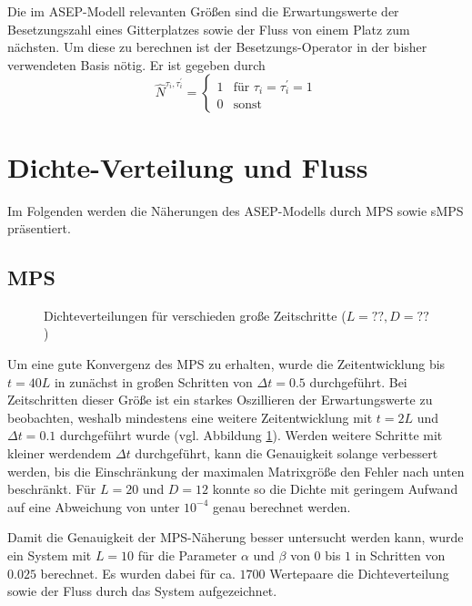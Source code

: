 \documentclass[10pt,a4paper]{report}
\begin{document}
Die im ASEP-Modell relevanten Größen sind die Erwartungswerte der Besetzungszahl eines Gitterplatzes sowie der Fluss von einem Platz zum nächsten. Um diese zu berechnen ist der Besetzungs-Operator in der bisher verwendeten Basis nötig. Er ist gegeben durch
\begin{equation}
\hat{N}^{\tau_i,\tau_i^{\prime}}=
\begin{cases}
1&\text{für }\tau_i=\tau_i^{\prime}=1\\
0&\text{sonst}
\end{cases}
\end{equation}

\section{Dichte-Verteilung und Fluss}
Im Folgenden werden die Näherungen des ASEP-Modells durch MPS sowie sMPS präsentiert. 
\subsection{MPS}

\begin{figure}
\centering
{}
\caption{Dichteverteilungen für verschieden große Zeitschritte ($L=??,D=??$)}
\label{tMPS_time_error_img}
\end{figure}

Um eine gute Konvergenz des MPS zu erhalten, wurde die Zeitentwicklung bis $t=40L$ in zunächst in großen Schritten von $\Delta t=0.5$ durchgeführt. Bei Zeitschritten dieser Größe ist ein starkes Oszillieren der Erwartungswerte zu beobachten, weshalb mindestens eine weitere Zeitentwicklung mit $t=2L$ und $\Delta t=0.1$ durchgeführt wurde (vgl. Abbildung \ref{tMPS_time_error_img}). Werden weitere Schritte mit kleiner werdendem $\Delta t$ durchgeführt, kann die Genauigkeit solange verbessert werden, bis die Einschränkung der maximalen Matrixgröße den Fehler nach unten beschränkt. Für $L=20$ und $D=12$ konnte so die Dichte mit geringem Aufwand auf eine Abweichung von unter $10^{-4}$ genau berechnet werden.



Damit die Genauigkeit der MPS-Näherung besser untersucht werden kann, wurde ein System mit $L=10$ für die Parameter $\alpha$ und $\beta$  von $0$ bis $1$ in Schritten von $0.025$ berechnet. Es wurden dabei für ca. $1700$ Wertepaare die Dichteverteilung sowie der Fluss durch das System aufgezeichnet.\\
\end{document}
